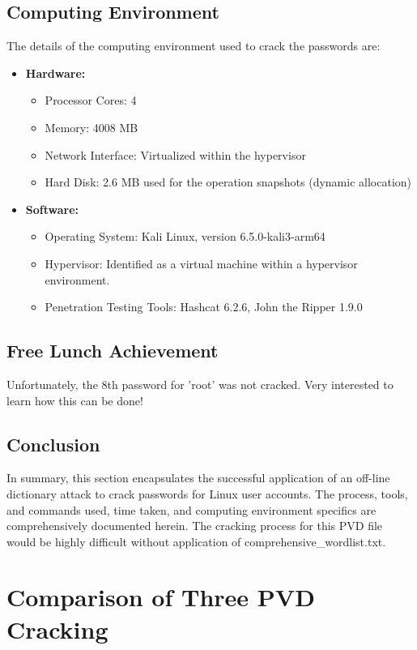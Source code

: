 \documentclass{article}
\begin{document}
\subsection{Computing Environment}
The details of the computing environment used to crack the passwords are:

\begin{itemize}
    \item \textbf{Hardware:}
    \begin{itemize}
        \item Processor Cores: 4
        \item Memory: 4008 MB
        \item Network Interface: Virtualized within the hypervisor
        \item Hard Disk: 2.6 MB used for the operation snapshots (dynamic allocation)
    \end{itemize}
    \item \textbf{Software:}
    \begin{itemize}
        \item Operating System: Kali Linux, version 6.5.0-kali3-arm64
        \item Hypervisor: Identified as a virtual machine within a hypervisor environment.
        \item Penetration Testing Tools: Hashcat 6.2.6, John the Ripper 1.9.0
    \end{itemize}
\end{itemize}

\subsection{Free Lunch Achievement}
Unfortunately, the 8th password for 'root' was not cracked. Very interested to learn how this can be done! 

\subsection{Conclusion}
In summary, this section encapsulates the successful application of an off-line dictionary attack to crack passwords for Linux user accounts. The process, tools, and commands used, time taken, and computing environment specifics are comprehensively documented herein. The cracking process for this PVD file would be highly difficult without application of comprehensive\_wordlist.txt. 

\section{Comparison of Three PVD Cracking}
\end{document}
